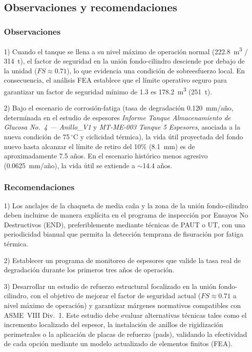 \documentclass[12pt,a4paper]{elsarticle}
\begin{document}
\subsection{Observaciones y recomendaciones}

\subsubsection{Observaciones}

1) Cuando el tanque se llena a su nivel m\'{a}ximo de operaci\'{o}n normal (222.8~m\textsuperscript{3} / 314~t), el factor de seguridad en la uni\'{o}n fondo-cilindro desciende por debajo de la unidad ($FS \approx 0.71$), lo que evidencia una condici\'{o}n de sobreesfuerzo local. En consecuencia, el an\'{a}lisis FEA establece que el l\'{i}mite operativo seguro para garantizar un factor de seguridad m\'{i}nimo de 1.3 es 178.2~m\textsuperscript{3} (251~t).

2) Bajo el escenario de corrosi\'{o}n-fatiga (tasa de degradaci\'{o}n 0.120~mm/a\~{n}o, determinada en el estudio de espesores \textit{Informe Tanque Almacenamiento de Glucosa No.~4 --- Anillo\_V1} y \textit{MT-ME-003 Tanque 5 Espesores}, asociada a la nueva condici\'{o}n de 75\,$^\circ$C y ciclicidad t\'{e}rmica), la vida \'{u}til proyectada del fondo nuevo hasta alcanzar el l\'{i}mite de retiro del 10\% (8.1~mm) es de aproximadamente 7.5 a\~{n}os. En el escenario hist\'{o}rico menos agresivo (0.0625~mm/a\~{n}o), la vida \'{u}til se extiende a $\sim$14.4 a\~{n}os.

\subsubsection{Recomendaciones}

1) Los anclajes de la chaqueta de media ca\~{n}a y la zona de la uni\'{o}n fondo-cilindro deben incluirse de manera expl\'{i}cita en el programa de inspecci\'{o}n por Ensayos No Destructivos (END), preferiblemente mediante t\'{e}cnicas de PAUT o UT, con una periodicidad bianual que permita la detecci\'{o}n temprana de fisuraci\'{o}n por fatiga t\'{e}rmica.

2) Establecer un programa de monitoreo de espesores que valide la tasa real de degradaci\'{o}n durante los primeros tres a\~{n}os de operaci\'{o}n.

3) Desarrollar un estudio de refuerzo estructural focalizado en la uni\'{o}n fondo-cilindro, con el objetivo de mejorar el factor de seguridad actual ($FS \approx 0.71$ a nivel m\'{a}ximo de operaci\'{o}n) y garantizar m\'{a}rgenes normativos compatibles con ASME~VIII Div.~1. Este estudio debe evaluar alternativas t\'{e}cnicas tales como el incremento localizado del espesor, la instalaci\'{o}n de anillos de rigidizaci\'{o}n perimetrales o la aplicaci\'{o}n de placas de refuerzo (pads), validando la efectividad de cada opci\'{o}n mediante un modelo actualizado de elementos finitos (FEA).
\end{document}
